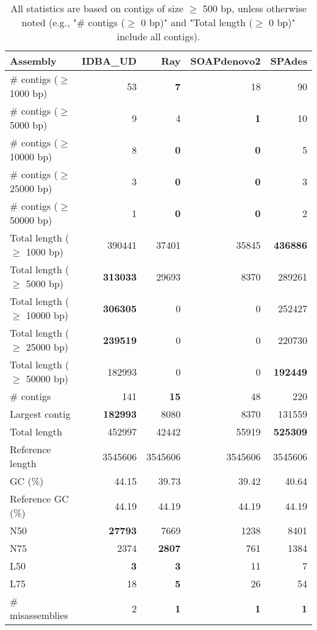\documentclass[12pt,a4paper]{article}
\begin{document}
\begin{table}[ht]
\begin{center}
\caption{All statistics are based on contigs of size $\geq$ 500 bp, unless otherwise noted (e.g., "\# contigs ($\geq$ 0 bp)" and "Total length ($\geq$ 0 bp)" include all contigs).}
\begin{tabular}{|l*{4}{|r}|}
\hline
Assembly & IDBA\_UD & Ray & SOAPdenovo2 & SPAdes \\ \hline
\# contigs ($\geq$ 1000 bp) & 53 & {\bf 7} & 18 & 90 \\ \hline
\# contigs ($\geq$ 5000 bp) & 9 & 4 & {\bf 1} & 10 \\ \hline
\# contigs ($\geq$ 10000 bp) & 8 & {\bf 0} & {\bf 0} & 5 \\ \hline
\# contigs ($\geq$ 25000 bp) & 3 & {\bf 0} & {\bf 0} & 3 \\ \hline
\# contigs ($\geq$ 50000 bp) & 1 & {\bf 0} & {\bf 0} & 2 \\ \hline
Total length ($\geq$ 1000 bp) & 390441 & 37401 & 35845 & {\bf 436886} \\ \hline
Total length ($\geq$ 5000 bp) & {\bf 313033} & 29693 & 8370 & 289261 \\ \hline
Total length ($\geq$ 10000 bp) & {\bf 306305} & 0 & 0 & 252427 \\ \hline
Total length ($\geq$ 25000 bp) & {\bf 239519} & 0 & 0 & 220730 \\ \hline
Total length ($\geq$ 50000 bp) & 182993 & 0 & 0 & {\bf 192449} \\ \hline
\# contigs & 141 & {\bf 15} & 48 & 220 \\ \hline
Largest contig & {\bf 182993} & 8080 & 8370 & 131559 \\ \hline
Total length & 452997 & 42442 & 55919 & {\bf 525309} \\ \hline
Reference length & 3545606 & 3545606 & 3545606 & 3545606 \\ \hline
GC (\%) & 44.15 & 39.73 & 39.42 & 40.64 \\ \hline
Reference GC (\%) & 44.19 & 44.19 & 44.19 & 44.19 \\ \hline
N50 & {\bf 27793} & 7669 & 1238 & 8401 \\ \hline
N75 & 2374 & {\bf 2807} & 761 & 1384 \\ \hline
L50 & {\bf 3} & {\bf 3} & 11 & 7 \\ \hline
L75 & 18 & {\bf 5} & 26 & 54 \\ \hline
\# misassemblies & 2 & {\bf 1} & {\bf 1} & {\bf 1} \\ \hline

\end{tabular}
\end{center}
\end{table}
\end{document}
